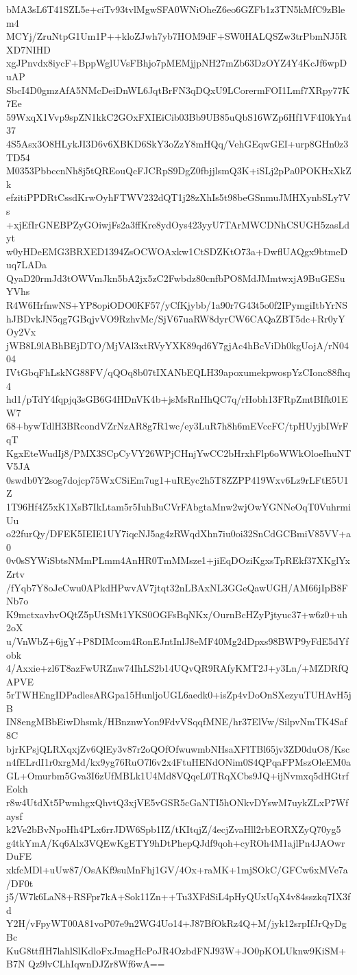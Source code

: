 bMA3sL6T41SZL5e+ciTv93tvlMgwSFA0WNiOheZ6eo6GZFb1z3TN5kMfC9zBlem4
MCYj/ZruNtpG1Um1P++kloZJwh7yb7HOM9dF+SW0HALQSZw3trPbmNJ5RXD7NIHD
xgJPnvdx8iycF+BppWglUVsFBhjo7pMEMjjpNH27mZb63DzOYZ4Y4KcJf6wpDuAP
SbcI4D0gmzAfA5NMcDeiDnWL6JqtBrFN3qDQxU9LCorermFOI1Lmf7XRpy77K7Ee
59WxqX1Vvp9spZN1kkC2GOxFXIEiCib03Bb9UB85uQbS16WZp6Hf1VF4I0kYn437
4S5Asx3O8HLykJI3D6v6XBKD6SkY3oZzY8mHQq/VehGEqwGEI+urp8GHn0z3TD54
M0353PbbccnNh8j5tQREouQcFJCRpS9DgZ0fbjjlsmQ3K+iSLj2pPa0POKHxXkZk
efzitiPPDRtCssdKrwOyhFTWV232dQT1j28zXhIs5t98beGSnmuJMHXynbSLy7Vs
+xjEfIrGNEBPZyGOiwjFs2a3ffKre8ydOys423yyU7TArMWCDNhCSUGH5zasLdyt
w0yHDeEMG3BRXED1394ZsOCWOAxkw1CtSDZKtO73a+DwflUAQgx9btmeDuq7LADa
QyaD20rmJd3tOWVmJkn5bA2jx5zC2Fwbdz80cnfbPO8MdJMmtwxjA9BuGESuYVhs
R4W6HrfnwNS+YP8opiODO0KF57/yCfKjybb/1a90r7G43t5o0f2IPymgiItbYrNS
hJBDvkJN5qg7GBqjvVO9RzhvMc/SjV67uaRW8dyrCW6CAQaZBT5dc+Rr0yYOy2Vx
jWB8L9lABhBEjDTO/MjVAl3xtRVyYXK89qd6Y7gjAc4hBcViDh0kgUojA/rN0404
IVtGbqFhLskNG88FV/qQOq8b07tIXANbEQLH39apoxumekpwospYzCIonc88fhq4
hd1/pTdY4fqpjq3sGB6G4HDnVK4b+jsMsRnHhQC7q/rHobh13FRpZmtBIfk01EW7
68+bywTdlH3BRcondVZrNzAR8g7R1wc/ey3LuR7h8h6mEVccFC/tpHUyjbIWrFqT
KgxEteWudIj8/PMX3SCpCyVY26WPjCHnjYwCC2bHrxhFlp6oWWkOloeIhuNTV5JA
0swdb0Y2sog7dojcp75WxCSiEm7ug1+uREyc2h5T8ZZPP419Wxv6Lz9rLFtE5U1Z
1T96Hf4Z5xK1XsB7IkLtam5r5IuhBuCVrFAbgtaMnw2wjOwYGNNeOqT0VuhrmiUu
o22furQy/DFEK5IEIE1UY7iqcNJ5ag4zRWqdXhn7iu0oi32SnCdGCBmiV85VV+a0
0v0sSYWiSbtsNMmPLmm4AnHR0TmMMsze1+jiEqDOziKgxsTpREkf37XKglYxZrtv
/fYqb7Y8oJeCwu0APkdHPwvAV7jtqt32nLBAxNL3GGeQawUGH/AM66jIpB8FNb7o
K9mctxavhvOQtZ5pUtSMt1YKS0OGFsBqNKx/OurnBcHZyPjtyuc37+w6z0+uh2oX
u/VnWbZ+6jgY+P8DIMcom4RonEJntInlJ8eMF40Mg2dDpxs98BWP9yFdE5dYfobk
4/Axxie+zl6T8azFwURZnw74IhLS2b14UQvQR9RAfyKMT2J+y3Ln/+MZDRfQAPVE
5rTWHEngIDPadlesARGpa15HunljoUGL6aedk0+isZp4vDoOnSXezyuTUHAvH5jB
IN8engMBbEiwDhsmk/HBnznwYon9FdvVSqqfMNE/hr37ElVw/SilpvNmTK4Saf8C
bjrKPsjQLRXqxjZv6QlEy3v87r2oQOfOfwuwmbNHsaXFlTBl65jv3ZD0duO8/Ksc
n4fELrdI1r0xrgMd/kx9yg76RuO7l6v2x4FtuHENdONim0S4QPqaFPMszOleEM0a
GL+Omurbm5Gva3I6zUfMBLk1U4Md8VQqeL0TRqXCbs9JQ+ijNvmxq5dHGtrfEokh
r8w4UtdXt5PwmhgxQhvtQ3xjVE5vGSR5cGaNTI5hONkvDYswM7uykZLxP7Wfaysf
k2Ve2bBvNpoHh4PLx6rrJDW6Spb1IZ/tKItqjZ/4ecjZvaHll2rbEORXZyQ70yg5
g4tkYmA/Kq6Alx3VQEwKgETY9hDtPhepQJdf9qoh+cyROh4M1ajlPn4JAOwrDuFE
xkfcMDl+uUw87/OsAKf9suMnFhj1GV/4Ox+raMK+1mjSOkC/GFCw6xMVe7a/DF0t
j5/W7k6LaN8+RSFpr7kA+Sok11Zn++Tu3XFdSiL4pHyQUxUqX4v84sszkq7IX3fd
Y2H/vFpyWT00A81voP07e9n2WG4Uo14+J87BfOkRz4Q+M/jyk12srpIfJrQyDgBc
KuG8ttfIH7lahlSlKdloFxJmagHcPoJR4OzbdFNJ93W+JO0pKOLUknw9KiSM+B7N
Qz9lvCLhIqwnDJZr8Wf6wA==
